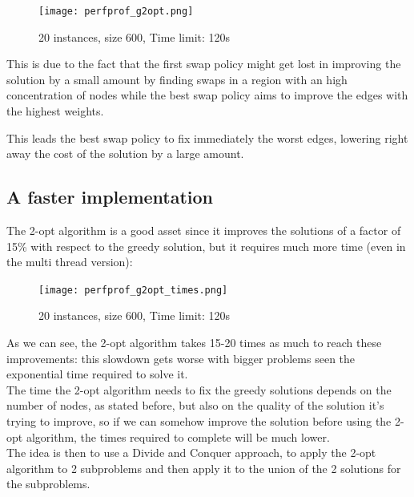 \begin{figure}[h]
    \centering
    \texttt{[image: perfprof\_g2opt.png]}
    \caption*{20 instances, size 600, Time limit: 120s}
\end{figure}

This is due to the fact that the first swap policy might get lost in improving the solution by a small amount by finding swaps in a region with an high concentration of nodes while the best swap policy aims to improve the edges with the highest weights.

This leads the best swap policy to fix immediately the worst edges, lowering right away the cost of the solution by a large amount.

\newpage

\subsection{A faster implementation}

The 2-opt algorithm is a good asset since it improves the solutions of a factor of 15\% with respect to the greedy solution, but it requires much more time (even in the multi thread version):
\begin{figure}[h]
    \centering
    \texttt{[image: perfprof\_g2opt\_times.png]}
    \caption*{20 instances, size 600, Time limit: 120s}
\end{figure}

As we can see, the 2-opt algorithm takes 15-20 times as much to reach these improvements: this slowdown gets worse with bigger problems seen the exponential time required to solve it.\\

The time the 2-opt algorithm needs to fix the greedy solutions depends on the number of nodes, as stated before, but also on the quality of the solution it's trying to improve, so if we can somehow improve the solution before using the 2-opt algorithm, the times required to complete will be much lower.\\

The idea is then to use a Divide and Conquer approach, to apply the 2-opt algorithm to 2 subproblems and then apply it to the union of the 2 solutions for the subproblems.\\

